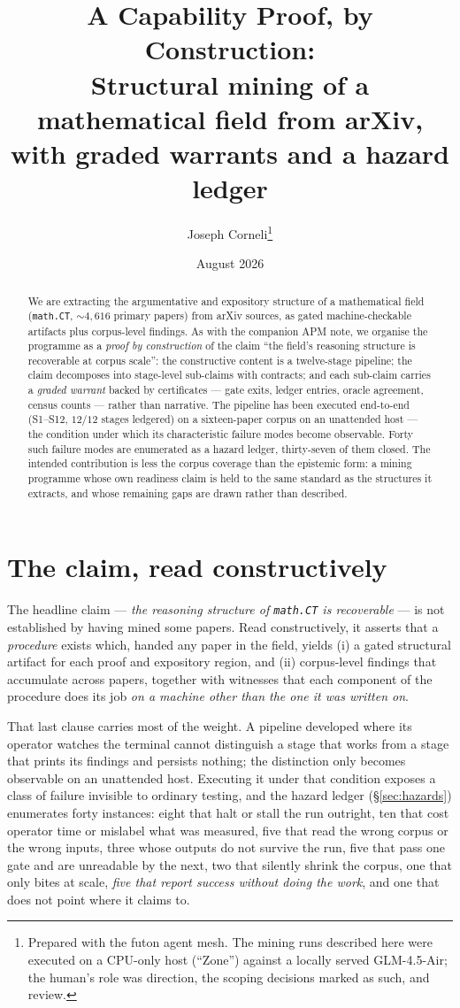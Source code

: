 \documentclass[11pt]{article}
\title{A Capability Proof, by Construction:\\
\large Structural mining of a mathematical field from arXiv,\\
with graded warrants and a hazard ledger}
\author{Joseph Corneli\thanks{Prepared with the futon agent mesh. The mining
runs described here were executed on a CPU-only host (``Zone'') against a
locally served GLM-4.5-Air; the human's role was direction, the scoping
decisions marked as such, and review.}}
\date{August 2026}
\begin{document}
\maketitle

\begin{abstract}\noindent
We are extracting the argumentative and expository structure of a mathematical
field (\texttt{math.CT}, ${\sim}4{,}616$ primary papers) from arXiv sources, as
gated machine-checkable artifacts plus corpus-level findings. As with the
companion APM note, we organise the programme as a \emph{proof by construction}
of the claim ``the field's reasoning structure is recoverable at corpus
scale'': the constructive content is a twelve-stage pipeline; the claim
decomposes into stage-level sub-claims with contracts; and each sub-claim
carries a \emph{graded warrant} backed by certificates --- gate exits, ledger
entries, oracle agreement, census counts --- rather than narrative.
The pipeline has been executed end-to-end (S1--S12, $12/12$ stages ledgered) on
a sixteen-paper corpus on an unattended host --- the condition under which its
characteristic failure modes become observable. Forty such failure modes
are enumerated as a hazard ledger, thirty-seven of them closed. The
intended contribution is less the corpus coverage than the epistemic form: a
mining programme whose own readiness claim is held to the same standard as the
structures it extracts, and whose remaining gaps are drawn rather than
described.
\end{abstract}

\section{The claim, read constructively}

The headline claim --- \emph{the reasoning structure of \texttt{math.CT} is
recoverable} --- is not established by having mined some papers. Read
constructively, it asserts that a \emph{procedure} exists which, handed any
paper in the field, yields (i) a gated structural artifact for each proof and
expository region, and (ii) corpus-level findings that accumulate across
papers, together with witnesses that each component of the procedure does its
job \emph{on a machine other than the one it was written on}.

That last clause carries most of the weight. A pipeline developed where its
operator watches the terminal cannot distinguish a stage that works from a stage
that prints its findings and persists nothing; the distinction only becomes
observable on an unattended host. Executing it under that condition exposes a
class of failure invisible to ordinary testing, and the hazard ledger
(\S\ref{sec:hazards}) enumerates forty instances: eight that halt or stall
the run outright, ten that cost operator time or mislabel what was measured,
five that read the wrong corpus or the wrong inputs, three whose outputs do not
survive the run, five that pass one gate and are unreadable by the next, two
that silently shrink the corpus, one that only bites at scale,
\emph{five that report success without doing the work}, and one that does not
point where it claims to.
\end{document}
